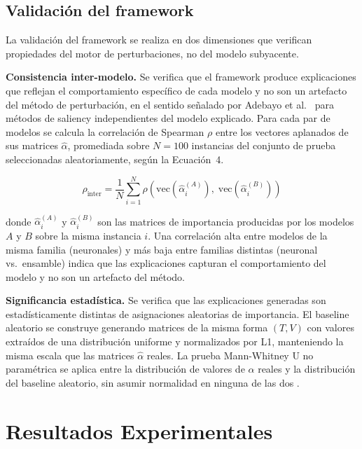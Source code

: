 \documentclass[conference, letterpaper]{IEEEtran}
\begin{document}
\subsection{Validación del framework}

La validación del framework se realiza en dos dimensiones que 
verifican propiedades del motor de perturbaciones, no del 
modelo subyacente.

\textbf{Consistencia inter-modelo.} Se verifica que el framework
produce explicaciones que reflejan el comportamiento específico
de cada modelo y no son un artefacto del método de perturbación,
en el sentido señalado por Adebayo et al.~\cite{adebayo2018} para
métodos de saliency independientes del modelo explicado.
Para cada par de modelos se calcula la correlación de Spearman
$\rho$ entre los vectores aplanados de sus matrices
$\hat{\alpha}$, promediada sobre $N=100$ instancias del conjunto
de prueba seleccionadas aleatoriamente, según la Ecuación~4.

\begin{equation}
    \rho_{\text{inter}} = \frac{1}{N} \sum_{i=1}^{N} 
    \rho\!\left( 
    \text{vec}(\hat{\alpha}_i^{(A)}),\; 
    \text{vec}(\hat{\alpha}_i^{(B)}) 
    \right)
\end{equation}

donde $\hat{\alpha}_i^{(A)}$ y $\hat{\alpha}_i^{(B)}$ son las 
matrices de importancia producidas por los modelos $A$ y $B$ 
sobre la misma instancia $i$. Una correlación alta entre modelos 
de la misma familia (neuronales) y más baja entre familias 
distintas (neuronal vs.\ ensamble) indica que las explicaciones 
capturan el comportamiento del modelo y no son un artefacto del 
método.

\textbf{Significancia estadística.} Se verifica que las 
explicaciones generadas son estadísticamente distintas de 
asignaciones aleatorias de importancia. El baseline aleatorio 
se construye generando matrices de la misma forma $(T, V)$ con 
valores extraídos de una distribución uniforme y normalizados 
por L1, manteniendo la misma escala que las matrices 
$\hat{\alpha}$ reales. La prueba Mann-Whitney U no paramétrica 
se aplica entre la distribución de valores de $\hat{\alpha}$ 
reales y la distribución del baseline aleatorio, sin asumir 
normalidad en ninguna de las dos \cite{schlegel2019}.

\section{Resultados Experimentales}
\end{document}
